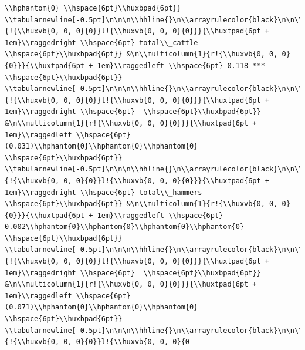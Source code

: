 \documentclass[11pt,preprint, authoryear]{elsarticle}
\numberwithin{equation}{section}
\numberwithin{figure}{section}
\numberwithin{table}{section}
\begin{document}
\begin{verbatim}
\\hphantom{0} \\hspace{6pt}\\huxbpad{6pt}} \\tabularnewline[-0.5pt]\n\n\n\\hhline{}\n\\arrayrulecolor{black}\n\n\\multicolumn{1}{!{\\huxvb{0, 0, 0}{0}}l!{\\huxvb{0, 0, 0}{0}}}{\\huxtpad{6pt + 1em}\\raggedright \\hspace{6pt} total\\_cattle \\hspace{6pt}\\huxbpad{6pt}} &\n\\multicolumn{1}{r!{\\huxvb{0, 0, 0}{0}}}{\\huxtpad{6pt + 1em}\\raggedleft \\hspace{6pt} 0.118 *** \\hspace{6pt}\\huxbpad{6pt}} \\tabularnewline[-0.5pt]\n\n\n\\hhline{}\n\\arrayrulecolor{black}\n\n\\multicolumn{1}{!{\\huxvb{0, 0, 0}{0}}l!{\\huxvb{0, 0, 0}{0}}}{\\huxtpad{6pt + 1em}\\raggedright \\hspace{6pt}  \\hspace{6pt}\\huxbpad{6pt}} &\n\\multicolumn{1}{r!{\\huxvb{0, 0, 0}{0}}}{\\huxtpad{6pt + 1em}\\raggedleft \\hspace{6pt} (0.031)\\hphantom{0}\\hphantom{0}\\hphantom{0} \\hspace{6pt}\\huxbpad{6pt}} \\tabularnewline[-0.5pt]\n\n\n\\hhline{}\n\\arrayrulecolor{black}\n\n\\multicolumn{1}{!{\\huxvb{0, 0, 0}{0}}l!{\\huxvb{0, 0, 0}{0}}}{\\huxtpad{6pt + 1em}\\raggedright \\hspace{6pt} total\\_hammers \\hspace{6pt}\\huxbpad{6pt}} &\n\\multicolumn{1}{r!{\\huxvb{0, 0, 0}{0}}}{\\huxtpad{6pt + 1em}\\raggedleft \\hspace{6pt} 0.002\\hphantom{0}\\hphantom{0}\\hphantom{0}\\hphantom{0} \\hspace{6pt}\\huxbpad{6pt}} \\tabularnewline[-0.5pt]\n\n\n\\hhline{}\n\\arrayrulecolor{black}\n\n\\multicolumn{1}{!{\\huxvb{0, 0, 0}{0}}l!{\\huxvb{0, 0, 0}{0}}}{\\huxtpad{6pt + 1em}\\raggedright \\hspace{6pt}  \\hspace{6pt}\\huxbpad{6pt}} &\n\\multicolumn{1}{r!{\\huxvb{0, 0, 0}{0}}}{\\huxtpad{6pt + 1em}\\raggedleft \\hspace{6pt} (0.071)\\hphantom{0}\\hphantom{0}\\hphantom{0} \\hspace{6pt}\\huxbpad{6pt}} \\tabularnewline[-0.5pt]\n\n\n\\hhline{}\n\\arrayrulecolor{black}\n\n\\multicolumn{1}{!{\\huxvb{0, 0, 0}{0}}l!{\\huxvb{0, 0, 0}{0
\end{verbatim}
\end{document}
